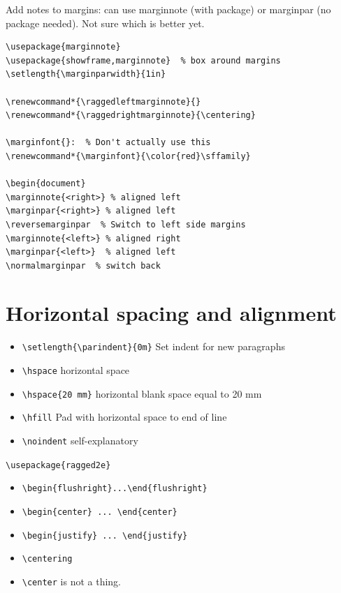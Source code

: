 \documentclass{article}
\begin{document}
Add notes to margins: can use marginnote (with package) or marginpar
(no package needed). Not sure which is better yet.
\begin{lstlisting}
\usepackage{marginnote}
\usepackage{showframe,marginnote}  % box around margins
\setlength{\marginparwidth}{1in}

\renewcommand*{\raggedleftmarginnote}{}
\renewcommand*{\raggedrightmarginnote}{\centering}

\marginfont{}:  % Don't actually use this
\renewcommand*{\marginfont}{\color{red}\sffamily}

\begin{document}
\marginnote{<right>} % aligned left
\marginpar{<right>} % aligned left
\reversemarginpar  % Switch to left side margins
\marginnote{<left>} % aligned right
\marginpar{<left>}  % aligned left
\normalmarginpar  % switch back
\end{lstlisting}

\section{Horizontal spacing and alignment}
\begin{itemize}
    \item \verb|\setlength{\parindent}{0m}| Set indent for new paragraphs
    \item \verb|\hspace| horizontal space
    \item \verb|\hspace{20 mm}| horizontal blank space equal to 20 mm
    \item \verb|\hfill| Pad with horizontal space to end of line
    \item \verb|\noindent| self-explanatory
\end{itemize}

\verb|\usepackage{ragged2e}|
\begin{itemize}
    \item \verb|\begin{flushright}...\end{flushright}|
    \item \verb|\begin{center} ... \end{center}|
    \item \verb|\begin{justify} ... \end{justify}|
    \item \verb|\centering|
    \item \verb|\center| is not a thing.
\end{itemize}
\end{document}

